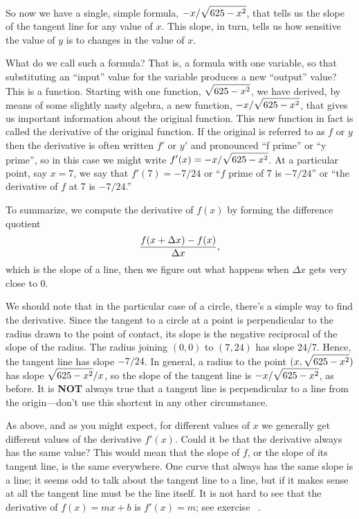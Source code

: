 So now we have a single, simple formula, $\displaystyle {-x/ \sqrt{625-x^2}}$,
that tells us the slope of the tangent line for any value of
$x$. This slope, in turn, tells us how sensitive the value of $y$ is
to changes in the value of $x$. 

What do we call such a formula? That is, a formula with one variable,
so that substituting an ``input'' value for the variable produces a
new ``output'' value? This is a function. Starting with one function,
$\displaystyle \sqrt{625-x^2}$, we have derived, by means of some slightly nasty
algebra, a new function, $\displaystyle {-x/ \sqrt{625-x^2}}$, that gives us
important information about the original function. This new function
in fact is called the {\dfont derivative} of the
original function. If the original is referred to as $f$ or $y$ then
the derivative is often written $f'$ or $y'$ and pronounced ``f
prime'' or ``y prime'', so in this case we might write $\displaystyle f'(x)=-x/
\sqrt{625-x^2}$. At a particular point, say $x=7$, we say that
$f'(7)=-7/24$ or ``$f$ prime of 7 is $-7/24$'' or ``the derivative of
$f$ at 7 is $-7/24$.''

To summarize, we compute the derivative of $f(x)$ by forming the
difference quotient
$$
{f(x+\Delta x)-f(x)\over \Delta x},
$$
which is the slope of a line, then we figure out what happens when
$\Delta x$ gets very close to 0. 


We should note that in 
the particular case of a circle, there's a simple way to find the
derivative.  Since the tangent to a circle at a point is perpendicular to
the radius drawn to the point of contact, its slope is the negative
reciprocal of the slope of the radius.  The radius joining $(0,0)$ to
$(7,24)$ has slope 24/7.  Hence, the tangent line has slope
$-7/24$. In general, a radius to the point $\displaystyle (x,\sqrt{625-x^2})$ has
slope $\displaystyle \sqrt{625-x^2}/x$, so the slope of the tangent line is
$\displaystyle {-x/ \sqrt{625-x^2}}$, as before. It is {\bf NOT} always true that a
tangent line is perpendicular to a line from the origin---don't use
this shortcut in any other circumstance. 

As above, and as you might expect, for different values of $x$ we
generally get different values of the derivative $f'(x)$. Could it be
that the derivative always has the same value? This would mean that
the slope of $f$, or the slope of its tangent line, is the same
everywhere. One curve that always has the same slope is a line; it
seems odd to talk about the tangent line to a line, but if it makes
sense at all the tangent line must be the line itself. It is not hard
to see that the derivative of $f(x)=mx+b$ is $f'(x)=m$; see
exercise~ .

